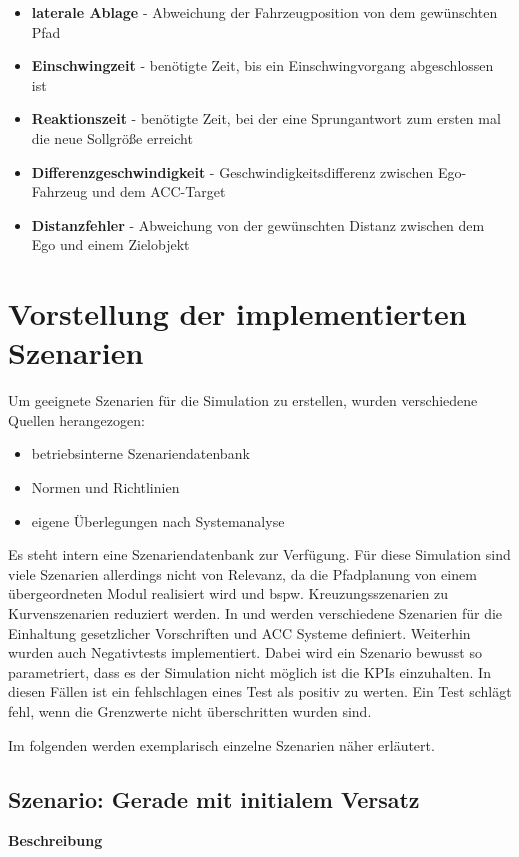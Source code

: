\begin{itemize}
    \item \textbf{laterale Ablage} - Abweichung der Fahrzeugposition von dem gewünschten Pfad
    \item \textbf{Einschwingzeit} - benötigte Zeit, bis ein Einschwingvorgang abgeschlossen ist
    \item \textbf{Reaktionszeit} - benötigte Zeit, bei der eine Sprungantwort zum ersten mal die neue Sollgröße erreicht 
    \item \textbf{Differenzgeschwindigkeit} - Geschwindigkeitsdifferenz zwischen Ego-Fahrzeug und dem ACC-Target
    \item \textbf{Distanzfehler} - Abweichung von der gewünschten Distanz zwischen dem Ego und einem Zielobjekt
\end{itemize}

\section{Vorstellung der implementierten Szenarien} \label{sec:Vorstellung_Szenarien}

Um geeignete Szenarien für die Simulation zu erstellen, wurden verschiedene Quellen herangezogen:
\begin{itemize}
    \item betriebsinterne Szenariendatenbank
    \item Normen und Richtlinien 
    \item eigene Überlegungen nach Systemanalyse
\end{itemize}
Es steht intern eine Szenariendatenbank zur Verfügung. Für diese Simulation sind viele Szenarien allerdings nicht von Relevanz, da die Pfadplanung von einem übergeordneten Modul realisiert wird und bspw. Kreuzungsszenarien zu Kurvenszenarien reduziert werden. In \cite{ISO15622} und \cite{NCAP2024} werden verschiedene Szenarien für die Einhaltung gesetzlicher Vorschriften und ACC Systeme definiert. Weiterhin wurden auch Negativtests implementiert. Dabei wird ein Szenario bewusst so parametriert, dass es der Simulation nicht möglich ist die KPIs einzuhalten. In diesen Fällen ist ein fehlschlagen eines Test als positiv zu werten. Ein Test schlägt fehl, wenn die Grenzwerte nicht überschritten wurden sind. 

Im folgenden werden exemplarisch einzelne Szenarien näher erläutert. 

\subsection{Szenario: Gerade mit initialem Versatz}
\textbf{Beschreibung}

